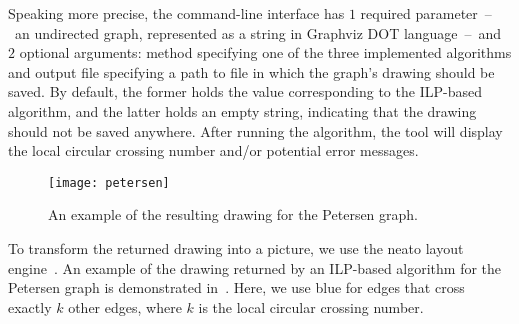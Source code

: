 Speaking more precise, the command-line interface has \(1\) required parameter~--~an undirected graph, represented as a string in Graphviz \textsc{DOT} language~--~and \(2\) optional arguments: method specifying one of the three implemented algorithms and output file specifying a path to file in which the graph's drawing should be saved. By default, the former holds the value corresponding to the ILP-based algorithm, and the latter holds an empty string, indicating that the drawing should not be saved anywhere. After running the algorithm, the tool will display the local circular crossing number and/or potential error messages.

\begin{figure}
    \centering
    \texttt{[image: petersen]}
    \caption{An example of the resulting drawing for the Petersen graph.}
    \label{fig:demo}
\end{figure}

To transform the returned drawing into a picture, we use the \textsf{neato} layout engine~\cite{neato}. An example of the drawing returned by an ILP-based algorithm for the Petersen graph is demonstrated in~. Here, we use blue for edges that cross exactly \(k\) other edges, where \(k\) is the local circular crossing number.
